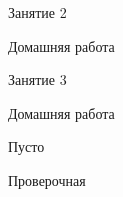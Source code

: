 \begin{class}[number=2]
	\begin{listofex}
		\item Занятие 2
	\end{listofex}
\end{class}

\begin{homework}[number=2]
	\begin{listofex}
		\item Домашняя работа
	\end{listofex}
\end{homework}

\begin{class}[number=3]
	\begin{listofex}
		\item Занятие 3
	\end{listofex}
\end{class}

\begin{homework}[number=3]
	\begin{listofex}
		\item Домашняя работа
	\end{listofex}
\end{homework}

\begin{class}[number=4]
	\begin{listofex}
		\item Пусто
	\end{listofex}
\end{class}


\begin{exam}
	\begin{listofex}
		\item Проверочная
	\end{listofex}
\end{exam}
